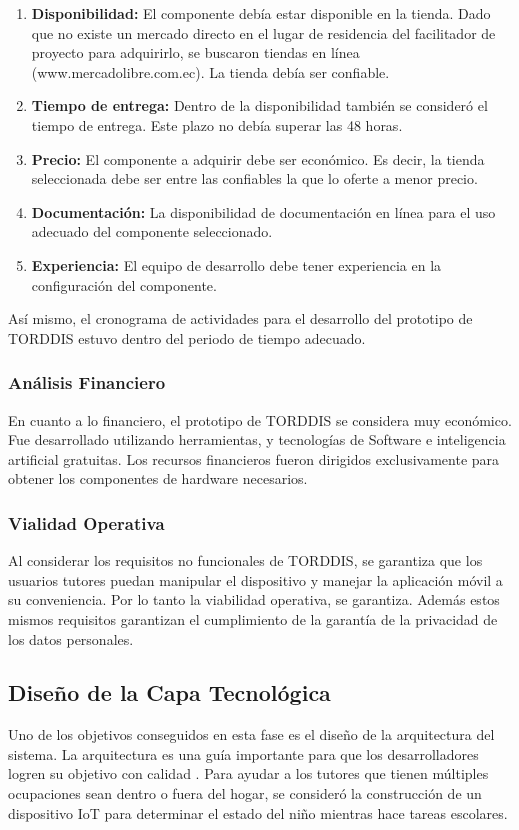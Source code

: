 \documentclass[a4paper,fleqn]{cas-sc}
\begin{document}
				\begin{enumerate}
					\item \textbf{Disponibilidad:} El componente debía estar disponible en la tienda. Dado que no existe un mercado directo en el lugar de residencia del facilitador de proyecto para adquirirlo, se buscaron tiendas en línea (www.mercadolibre.com.ec). La tienda debía ser confiable. 
					\item \textbf{Tiempo de entrega:} Dentro de la disponibilidad también se consideró el tiempo de entrega. Este plazo no debía superar las 48 horas.
					\item \textbf{Precio:} El componente a adquirir debe ser económico. Es decir, la tienda seleccionada debe ser entre las confiables la que lo oferte a menor precio.
					\item \textbf{Documentación:} La disponibilidad de documentación en línea para el uso adecuado del componente seleccionado.
					\item \textbf{Experiencia:} El equipo de desarrollo debe tener experiencia en la configuración del componente.
				\end{enumerate}
				
				Así mismo, el cronograma de actividades para el desarrollo del prototipo de TORDDIS estuvo dentro del periodo de tiempo adecuado.
			
			\subsubsection{Análisis Financiero}
				En cuanto a lo financiero, el prototipo de TORDDIS se considera muy económico. Fue desarrollado utilizando herramientas, y tecnologías de Software e inteligencia artificial gratuitas. Los recursos financieros fueron dirigidos exclusivamente para obtener los componentes de hardware necesarios.
				
			\subsubsection{Vialidad Operativa}
				Al considerar los requisitos no funcionales de TORDDIS, se garantiza que los usuarios tutores puedan manipular el dispositivo y manejar la aplicación móvil a su conveniencia. Por lo tanto la viabilidad operativa, se garantiza. Además estos mismos requisitos garantizan el cumplimiento de la garantía de la privacidad de los datos personales.
				
		\subsection{Diseño de la Capa Tecnológica}
			Uno de los objetivos conseguidos en esta fase es el diseño de la arquitectura del sistema. La arquitectura es una guía importante para que los desarrolladores logren su objetivo con calidad \cite{Liu2011Status}. Para ayudar a los tutores que tienen múltiples ocupaciones sean dentro o fuera del hogar, se consideró la construcción de un dispositivo IoT para determinar el estado del niño mientras hace tareas escolares. 
			
\end{document}
